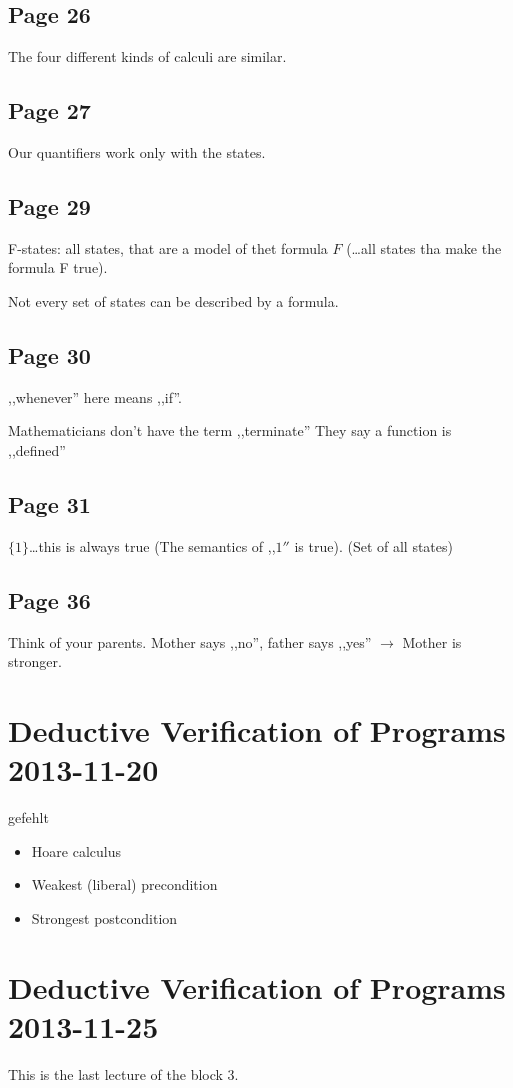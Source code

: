 \documentclass[a4paper]{article}
\begin{document}
\subsection{Page 26}
The four different kinds of calculi are similar.

\subsection{Page 27}
Our quantifiers work only with the states.

\subsection{Page 29}
F-states: all states, that are a model of thet formula $F$ (\ldots all states
tha make the formula F true).

Not every set of states can be described by a formula.

\subsection{Page 30}
,,whenever'' here means ,,if''.

Mathematicians don't have the term ,,terminate'' They say  a function is
,,defined''

\subsection{Page 31}
$\{1\}$\ldots this is always true (The semantics of ,,$1''$ is true). (Set of
all states)

\subsection{Page 36}
Think of your parents. Mother says ,,no'', father says ,,yes'' $\rightarrow$
Mother is stronger.


\section{Deductive Verification of Programs 2013-11-20}
gefehlt
\begin{itemize}
	\item Hoare calculus
	\item Weakest (liberal) precondition
	\item Strongest postcondition
\end{itemize}

\section{Deductive Verification of Programs 2013-11-25}
This is the last lecture of the block 3.
\end{document}
